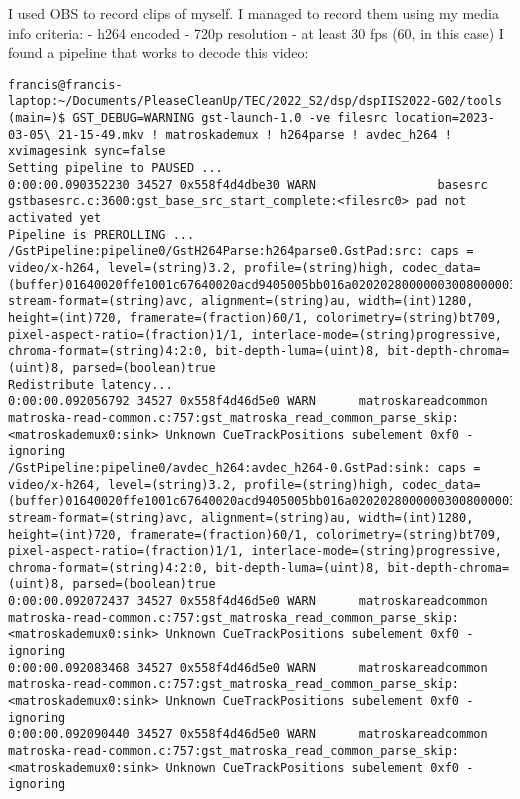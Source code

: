 \documentclass[12pt,oneside]{book}
\begin{document}
  I used OBS to record clips of myself.
  I managed to record them using my media info criteria:
  - h264 encoded
  - 720p resolution
  - at least 30 fps (60, in this case)
  I found a pipeline that works to decode this video:
  \begin{lstlisting}
francis@francis-laptop:~/Documents/PleaseCleanUp/TEC/2022_S2/dsp/dspIIS2022-G02/tools (main=)$ GST_DEBUG=WARNING gst-launch-1.0 -ve filesrc location=2023-03-05\ 21-15-49.mkv ! matroskademux ! h264parse ! avdec_h264 ! xvimagesink sync=false
Setting pipeline to PAUSED ...
0:00:00.090352230 34527 0x558f4d4dbe30 WARN                 basesrc gstbasesrc.c:3600:gst_base_src_start_complete:<filesrc0> pad not activated yet
Pipeline is PREROLLING ...
/GstPipeline:pipeline0/GstH264Parse:h264parse0.GstPad:src: caps = video/x-h264, level=(string)3.2, profile=(string)high, codec_data=(buffer)01640020ffe1001c67640020acd9405005bb016a02020280000003008000003c478c18cb01000568ef85f2c0, stream-format=(string)avc, alignment=(string)au, width=(int)1280, height=(int)720, framerate=(fraction)60/1, colorimetry=(string)bt709, pixel-aspect-ratio=(fraction)1/1, interlace-mode=(string)progressive, chroma-format=(string)4:2:0, bit-depth-luma=(uint)8, bit-depth-chroma=(uint)8, parsed=(boolean)true
Redistribute latency...
0:00:00.092056792 34527 0x558f4d46d5e0 WARN      matroskareadcommon matroska-read-common.c:757:gst_matroska_read_common_parse_skip:<matroskademux0:sink> Unknown CueTrackPositions subelement 0xf0 - ignoring
/GstPipeline:pipeline0/avdec_h264:avdec_h264-0.GstPad:sink: caps = video/x-h264, level=(string)3.2, profile=(string)high, codec_data=(buffer)01640020ffe1001c67640020acd9405005bb016a02020280000003008000003c478c18cb01000568ef85f2c0, stream-format=(string)avc, alignment=(string)au, width=(int)1280, height=(int)720, framerate=(fraction)60/1, colorimetry=(string)bt709, pixel-aspect-ratio=(fraction)1/1, interlace-mode=(string)progressive, chroma-format=(string)4:2:0, bit-depth-luma=(uint)8, bit-depth-chroma=(uint)8, parsed=(boolean)true
0:00:00.092072437 34527 0x558f4d46d5e0 WARN      matroskareadcommon matroska-read-common.c:757:gst_matroska_read_common_parse_skip:<matroskademux0:sink> Unknown CueTrackPositions subelement 0xf0 - ignoring
0:00:00.092083468 34527 0x558f4d46d5e0 WARN      matroskareadcommon matroska-read-common.c:757:gst_matroska_read_common_parse_skip:<matroskademux0:sink> Unknown CueTrackPositions subelement 0xf0 - ignoring
0:00:00.092090440 34527 0x558f4d46d5e0 WARN      matroskareadcommon matroska-read-common.c:757:gst_matroska_read_common_parse_skip:<matroskademux0:sink> Unknown CueTrackPositions subelement 0xf0 - ignoring

\end{lstlisting}
\end{document}
